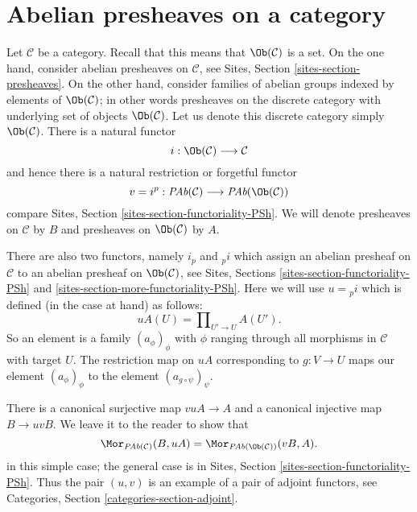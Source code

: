 \section{Abelian presheaves on a category}
\label{section-injectives-presheaves}

\noindent
Let $\mathcal{C}$ be a category. Recall that this means that
$\Ob(\mathcal{C})$ is a set. On the one hand, consider abelian
presheaves on $\mathcal{C}$, see
Sites, Section \ref{sites-section-presheaves}.
On the other hand, consider families of abelian groups
indexed by elements of $\Ob(\mathcal{C})$; in other
words presheaves on the discrete category with underlying set
of objects $\Ob(\mathcal{C})$. Let us denote this
discrete category simply $\Ob(\mathcal{C})$.
There is a natural functor
$$
i : \Ob(\mathcal{C}) \longrightarrow \mathcal{C}
$$
and hence there is a natural restriction or forgetful functor
$$
v = i^p :
\textit{PAb}(\mathcal{C})
\longrightarrow
\textit{PAb}(\Ob(\mathcal{C}))
$$
compare Sites, Section \ref{sites-section-functoriality-PSh}.
We will denote presheaves
on $\mathcal{C}$ by $B$ and presheaves on
$\Ob(\mathcal{C})$ by $A$.

\medskip\noindent
There are also two functors, namely $i_p$ and ${}_pi$
which assign an abelian presheaf on $\mathcal{C}$
to an abelian presheaf on $\Ob(\mathcal{C})$, see
Sites, Sections \ref{sites-section-functoriality-PSh} and
\ref{sites-section-more-functoriality-PSh}.
Here we will use $u = {}_pi$ which is defined (in the case at hand)
as follows:
$$
uA(U) = \prod\nolimits_{U' \to U} A(U').
$$
So an element is a family $(a_\phi)_\phi$ with $\phi$
ranging through all morphisms in $\mathcal{C}$ with target $U$.
The restriction map on $uA$ corresponding to $g : V \to U$
maps our element $(a_\phi)_\phi$ to the element
$(a_{g \circ \psi})_\psi$.

\medskip\noindent
There is a canonical surjective map $vuA \to A$ and a canonical
injective map $B \to uvB$. We leave it to the reader to show that
$$
\Mor_{\textit{PAb}(\mathcal{C})}(B, uA)
=
\Mor_{\textit{PAb}(\Ob(\mathcal{C}))}(vB, A).
$$
in this simple case; the general case is in
Sites, Section \ref{sites-section-functoriality-PSh}.
Thus the pair $(u, v)$ is an example of a pair of adjoint
functors, see
Categories, Section \ref{categories-section-adjoint}.

